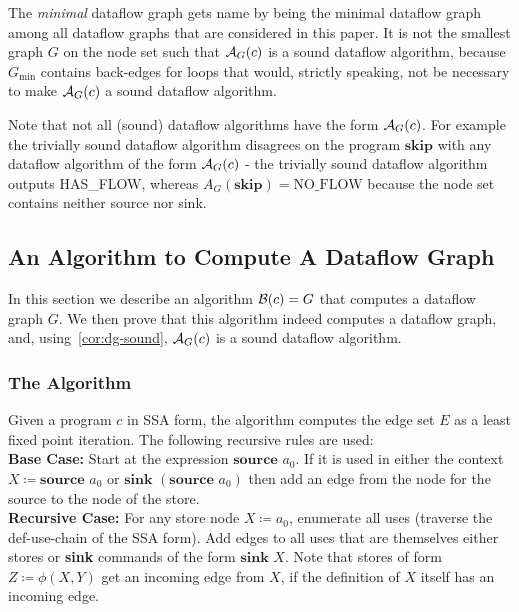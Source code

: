 \begin{remark}
    The \emph{minimal} dataflow graph gets name by being the minimal dataflow graph
    among all dataflow graphs that are considered in this paper.
    It is not the smallest graph $G$ on the node set 
    such that $\operatorname{\mathcal{A}}_G(c)$ is a sound dataflow algorithm,
    because $G_\text{min}$ contains back-edges for loops that would, strictly
    speaking, not be necessary to make $\operatorname{\mathcal{A}}_G(c)$ a sound dataflow algorithm.
\end{remark}

\begin{remark}
    Note that not all (sound) dataflow algorithms have the form $\operatorname{\mathcal{A}}_G(c)$.
    For example the trivially sound dataflow algorithm disagrees on the 
    program $\textbf{skip}$ with any dataflow algorithm of the form 
    $\operatorname{\mathcal{A}}_G(c)$ - the trivially sound
    dataflow algorithm outputs HAS\_FLOW, whereas
    $A_G(\textbf{skip}) = \text{NO\_FLOW}$ because the node set contains
    neither source nor sink.
\end{remark}

\subsection{An Algorithm to Compute A Dataflow Graph}
In this section we describe an algorithm $\operatorname{\mathcal{B}}(c) = G$ that computes a dataflow 
graph $G$. We then prove that this algorithm indeed
computes a dataflow graph, and, using~\autoref{cor:dg-sound},
$\operatorname{\mathcal{A}}_G(c)$ is a sound dataflow algorithm.

\subsubsection*{The Algorithm}
Given a program $c$ in SSA form, the algorithm computes
the edge set $E$ as a least fixed point iteration.
The following recursive rules are used:\\
\textbf{Base Case:} Start at the expression $\textbf{source }a_0$.
If it is used in either the context $X \coloneqq \textbf{source }a_0$
or $\textbf{sink }(\textbf{source }a_0)$ then add an edge from the node for the
source to the node of the store.\\
\textbf{Recursive Case:} For any store node $X \coloneqq a_0$, enumerate all uses (traverse
the def-use-chain of the SSA form). Add edges to all uses that are themselves
either stores or \textbf{sink} commands of the form $\textbf{sink } X$.
Note that stores of form $Z \coloneqq \phi(X, Y)$ get an incoming edge from $X$,
if the definition of $X$ itself has an incoming edge.

